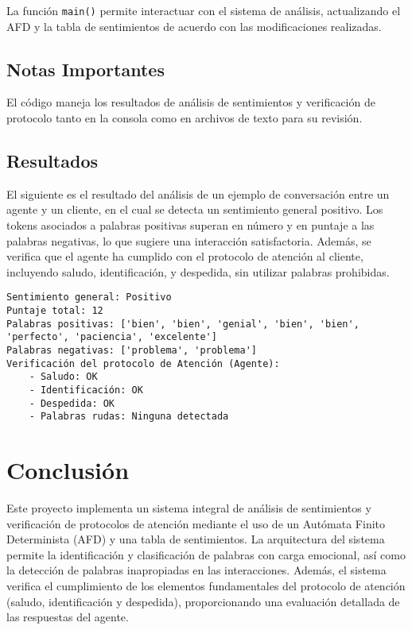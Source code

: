 \documentclass[12pt,a4paper]{article}
\begin{document}
La función \texttt{main()} permite interactuar con el sistema de análisis, actualizando el AFD y la tabla de sentimientos de acuerdo con las modificaciones realizadas.

\subsection*{Notas Importantes}
El código maneja los resultados de análisis de sentimientos y verificación de protocolo tanto en la consola como en archivos de texto para su revisión.

\subsection{Resultados}
El siguiente es el resultado del análisis de un ejemplo de conversación entre un agente y un cliente, en el cual se detecta un sentimiento general positivo. Los tokens asociados a palabras positivas superan en número y en puntaje a las palabras negativas, lo que sugiere una interacción satisfactoria. Además, se verifica que el agente ha cumplido con el protocolo de atención al cliente, incluyendo saludo, identificación, y despedida, sin utilizar palabras prohibidas.

\begin{tcolorbox}[colback=gray!10, colframe=gray!80, sharp corners, boxrule=0.5pt]
\begin{verbatim}
Sentimiento general: Positivo
Puntaje total: 12
Palabras positivas: ['bien', 'bien', 'genial', 'bien', 'bien', 
'perfecto', 'paciencia', 'excelente']
Palabras negativas: ['problema', 'problema']
Verificación del protocolo de Atención (Agente):
    - Saludo: OK
    - Identificación: OK
    - Despedida: OK
    - Palabras rudas: Ninguna detectada
\end{verbatim}
\end{tcolorbox}

\section{Conclusión}

Este proyecto implementa un sistema integral de análisis de sentimientos y verificación de protocolos de atención mediante el uso de un Autómata Finito Determinista (AFD) y una tabla de sentimientos. La arquitectura del sistema permite la identificación y clasificación de palabras con carga emocional, así como la detección de palabras inapropiadas en las interacciones. Además, el sistema verifica el cumplimiento de los elementos fundamentales del protocolo de atención (saludo, identificación y despedida), proporcionando una evaluación detallada de las respuestas del agente.
\end{document}
